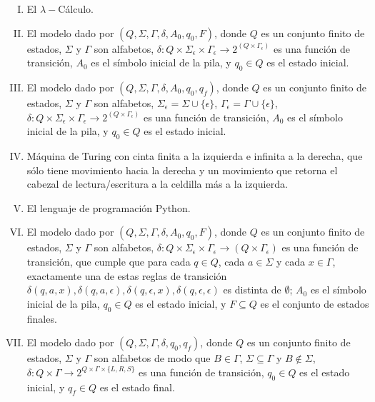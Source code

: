 \documentclass{article}
\begin{document}
\begin{enumerate}[I)]

\item El $\lambda-$Cálculo.

\item El modelo dado por $(Q,\Sigma,\Gamma,\delta,A_0,q_0,F)$, donde  $Q$ es un conjunto finito de estados, 
  $\Sigma$ y $\Gamma$ son alfabetos, $\delta:Q\times \Sigma_\epsilon\times\Gamma_\epsilon\rightarrow 2^{(Q\times\Gamma_\epsilon)}$ es  una función de transición, $A_0$ es el símbolo inicial de la pila, y $q_0\in Q$ es el estado inicial. 

\item El modelo dado por $(Q,\Sigma,\Gamma,\delta,A_0,q_0,q_f)$, donde  $Q$ es un conjunto finito de estados, $\Sigma$ y 
$\Gamma$ son alfabetos, $\Sigma_\epsilon=\Sigma \cup \{\epsilon\}$, $\Gamma_\epsilon=\Gamma \cup \{\epsilon\}$, $\delta:Q\times \Sigma_\epsilon\times\Gamma_\epsilon\rightarrow 2^{(Q\times\Gamma_\epsilon)}$ es  una  función de transición, $A_0$ es el símbolo inicial de la pila, y $q_0\in Q$ es el estado inicial. 

\item Máquina de Turing con cinta finita a la izquierda e infinita a la derecha, que sólo tiene movimiento hacia la derecha y un movimiento que retorna el cabezal de lectura/escritura a la celdilla más a la izquierda.

\item El lenguaje de programación Python.

\item El modelo dado por $(Q,\Sigma,\Gamma,\delta,A_0,q_0,F)$, donde  $Q$ es un conjunto finito de estados, 
  $\Sigma$ y $\Gamma$ son alfabetos, $\delta:Q\times \Sigma_\epsilon\times\Gamma_\epsilon\rightarrow(Q\times\Gamma_\epsilon)$ es  una función de transición, que cumple que para cada $q \in Q$, cada $a \in \Sigma$ y cada $x \in \Gamma$, exactamente una de estas reglas de transición $\delta(q,a,x),\delta(q,a,\epsilon),\delta(q,\epsilon,x),\delta(q,\epsilon,\epsilon)$ es distinta de  $\emptyset$;
  $A_0$ es el símbolo inicial de la pila, $q_0\in Q$ es el estado inicial, y $F\subseteq Q$ es el conjunto de  estados finales. 

\item El modelo dado por $(Q,\Sigma,\Gamma,\delta,q_0,q_f)$, donde $Q$ es un conjunto finito de estados, $\Sigma$ y
$\Gamma$ son alfabetos de modo que $B\in\Gamma$,  $\Sigma\subseteq\Gamma$ y $B \notin \Sigma$,  
$\delta:Q\times\Gamma\rightarrow 2^{Q\times\Gamma\times\{L,R, S\}}$ es  una función de transición, 
$q_0\in Q$ es el estado inicial, y $q_f\in Q$ es el estado final. 


\end{enumerate}
\end{document}
